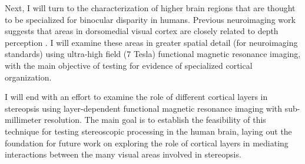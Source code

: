 Next, I will turn to the characterization of higher brain regions that are thought to be specialized for binocular disparity in humans. Previous neuroimaging work suggests that areas in dorsomedial visual cortex are closely related to depth perception \cite{Backus:2001ly,Tsao:2003lk,Preston:2008dg}. I will examine these areas in greater spatial detail (for neuroimaging standards) using ultra-high field (7 Tesla) functional magnetic resonance imaging, with the main objective of testing for evidence of specialized cortical organization.

I will end with an effort to examine the role of different cortical layers in stereopsis using layer-dependent functional magnetic resonance imaging with sub-millimeter resolution. The main goal is to establish the feasibility of this technique for testing stereoscopic processing in the human brain, laying out the foundation for future work on exploring the role of cortical layers in mediating interactions between the many visual areas involved in stereopsis.



